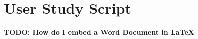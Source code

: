 \chapter{User Study Script} %
\label{sec:user_study_script}

\textbf{TODO: How do I embed a Word Document in \LaTeX{}}

